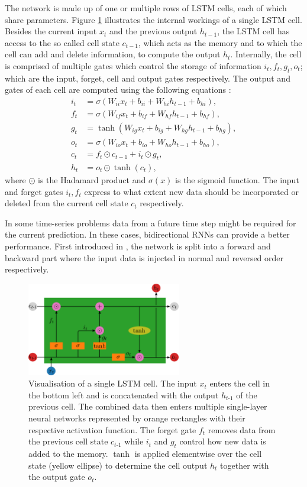 The network is made up of one or multiple rows of LSTM cells, each of which share parameters.
Figure \ref{lstm} illustrates the internal workings of a single LSTM cell.
Besides the current input $x_t$ and the previous output $h_{t-1}$, the LSTM cell has access to the so called cell state $c_{t-1}$, which acts as the memory and to which the cell can add and delete information, to compute the output $h_t$.
Internally, the cell is comprised of multiple gates which control the storage of information $i_t, f_t, g_t, o_t$; which are the input, forget, cell and output gates respectively.
The output and gates of each cell are computed using the following equations \cite{NEURIPS2019_9015}:
\begin{align*}
i_t & = \sigma (W_{ii} x_t + b_{ii} + W_{hi} h_{t-1} + b_{hi}), \\
f_t & = \sigma (W_{if} x_t + b_{if} + W_{hf} h_{t-1} + b_{hf}), \\
g_t & = \tanh (W_{ig} x_t + b_{ig} + W_{hg} h_{t-1} + b_{hg}), \\ 
o_t & = \sigma (W_{io} x_t + b_{io} + W_{ho} h_{t-1} + b_{ho}), \\
c_t & = f_t \odot c_{t-1} + i_t \odot g_t, \\
h_t & = o_t \odot \tanh (c_t),
\end{align*}
where $\odot$ is the Hadamard product and $\sigma(x)$ is the sigmoid function.
The input and forget gates $i_t, f_t$ express to what extent new data should be incorporated or deleted from the current cell state $c_t$ respectively.

In some time-series problems data from a future time step might be required for the current prediction.
In these cases, bidirectional RNNs can provide a better performance.
First introduced in \cite{bidirrnn}, the network is split into a forward and backward part where the input data is injected in normal and reversed order respectively.

\begin{figure}
	\centering
	\includegraphics[width=0.6\textwidth]{img/lstm}
	\caption{Visualisation of a single LSTM cell. The input $x_t$ enters the cell in the bottom left and is concatenated with the output $h_{t\text{-}1}$ of the previous cell. The combined data then enters multiple single-layer neural networks represented by orange rectangles with their respective activation function. The forget gate $f_t$ removes data from the previous cell state $c_{t\text{-}1}$ while $i_t$ and $g_t$ control how new data is added to the memory. $\tanh$ is applied elementwise over the cell state (yellow ellipse) to determine the cell output $h_t$ together with the output gate $o_t$.}
	\label{lstm}
\end{figure}

